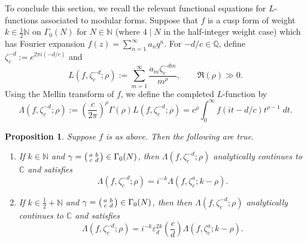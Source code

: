 \documentclass[12pt]{amsart}
\theoremstyle{definition}
\theoremstyle{plain}
\newtheorem{prop}[theorem]{Proposition}
\numberwithin{equation}{section}
\begin{document}
To conclude this section, we recall the relevant functional equations for $L$-functions associated to modular forms. 
Suppose that $f$ is a cusp form of weight $k \in \frac{1}{2}\mathbb{N}$ on $\Gamma_0(N)$ for $N \in \mathbb{N}$ (where $4\mid N$ in the half-integer weight case) which has Fourier expansion $f(z) = \sum_{n=1}^\infty a_n q^n$.
For $-d/c \in \mathbb{Q}$, define $\zeta_c^{-d} := e^{2\pi i (-d/c)}$ and
\[L(f, \zeta_c^{-d};\rho) := \sum_{m = 1}^\infty \frac{a_m \zeta_c^{-dm}}{m^\rho}, \quad \quad \Re(\rho)\gg 0.
\]
Using the Mellin transform of $f$, we define the completed $L$-function by
\[\Lambda(f, \zeta_c^{-d}; \rho) := \left( \frac{c}{2\pi}\right)^\rho \Gamma(\rho) L(f, \zeta_c^{-d}; \rho) = c^\rho \int_0^\infty f(it-d/c) t^{\rho-1}\;dt.
\]
 
 \begin{prop} Suppose $f$ is as above. Then the following are true. 
 \begin{enumerate}
 \item 	If $k \in \mathbb{N}$ and $\gamma = \begin{psmallmatrix} a & b \\ c & d\end{psmallmatrix} \in \Gamma_0(N)$, then $\Lambda(f, \zeta_c^{-d}; \rho)$ analytically continues to $\mathbb{C}$ and satisfies
  \[\Lambda(f, \zeta_c^{-d}; \rho) = i^{-k} \Lambda(f, \zeta_c^a;  k-\rho).
	\]
 \item If $k \in \frac{1}{2} + \mathbb{N}$ and $\gamma = \begin{psmallmatrix} a & b \\ c & d\end{psmallmatrix} \in \Gamma_0(N)$, then then $\Lambda(f, \zeta_c^{-d}; \rho)$ analytically continues to $\mathbb{C}$ and satisfies
 \[\Lambda(f, \zeta_c^{-d}; \rho) = i^{-k} \varepsilon_d^{2k} \left( \frac{c}{d}\right) \Lambda(f, \zeta_c^a; k-\rho).
	\]
 \end{enumerate}
 \end{prop}
 
\end{document}
